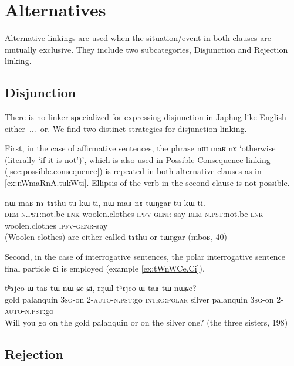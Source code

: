 \documentclass[oldfontcommands,oneside,a4paper,11pt]{article}
\newcommand{\ipa}[1]{{\phon \mbox{#1}}} %
\begin{document}
\section{Alternatives}
Alternative linkings are used when the situation/event in both clauses are mutually exclusive. They include two subcategories,  Disjunction and Rejection linking.  
\subsection{Disjunction}
There is no linker specialized for expressing disjunction in Japhug like English \ipa{either ... or}. We find two distinct strategies for disjunction linking.

First, in the case of affirmative sentences, the phrase \ipa{nɯ}    	\ipa{maʁ}    	\ipa{nɤ}  `otherwise (literally `if it is not')', which is also used in Possible Consequence linking (\ref{sec:possible.consequence}) is repeated in both alternative clauses as in \ref{ex:nWmaRnA.tukWti}. Ellipsis of the verb in the second clause  is not possible.
\begin{exe}
\ex \label{ex:nWmaRnA.tukWti}
\gll 
\ipa{nɯ}    	\ipa{maʁ}    	\ipa{nɤ}    	\ipa{tɤthu}    	\ipa{tu-kɯ-ti,}    	\ipa{nɯ}    	\ipa{maʁ}    	\ipa{nɤ}    	\ipa{tɯŋgar}    	\ipa{tu-kɯ-ti.}    \\
\textsc{dem} \textsc{n.pst:}not.be \textsc{lnk} woolen.clothes \textsc{ipfv-genr}-say \textsc{dem} \textsc{n.pst:}not.be \textsc{lnk} woolen.clothes \textsc{ipfv-genr}-say \\
\glt (Woolen clothes) are either called \ipa{tɤthu}  or \ipa{tɯŋgar}    (mboʁ, 40)
 \end{exe}

Second, in the case of interrogative sentences, the polar interrogative sentence final particle \ipa{ɕi} is employed (example \ref{ex:tWnWCe.Ci}).

\begin{exe}
\ex \label{ex:tWnWCe.Ci}
\gll \ipa{χsɤr}    	\ipa{tʰɤjco}    	\ipa{ɯ-taʁ}    	\ipa{tɯ-nɯ-ɕe}    	\ipa{ɕi,}    	\ipa{rŋɯl}    	\ipa{tʰɤjco}    	\ipa{ɯ-taʁ}    	\ipa{tɯ-nɯɕe?}    	\\
gold palanquin \textsc{3sg}-on \textsc{2-auto-n.pst}:go \textsc{intrg:polar} silver palanquin \textsc{3sg}-on \textsc{2-auto-n.pst}:go \\
\glt Will you go on the gold palanquin or on the silver one? (the three sisters, 198)
 \end{exe}
 
\subsection{Rejection} \label{sec:rejection}
\end{document}

